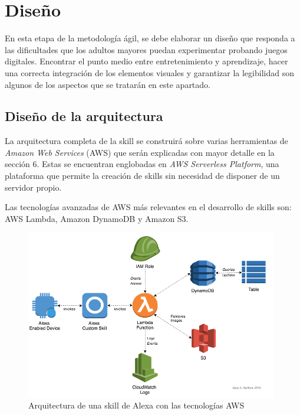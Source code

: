 \section{Diseño}

En esta etapa de la metodología ágil, se debe elaborar un diseño que responda a las dificultades que los adultos mayores puedan experimentar probando juegos digitales. Encontrar el punto medio entre entretenimiento y aprendizaje, hacer una correcta integración de los elementos visuales y garantizar la legibilidad son algunos de los aspectos que se tratarán en este apartado.

\subsection{Diseño de la arquitectura}

La arquitectura completa de la skill se construirá sobre varias herramientas de \textit{Amazon Web Services} (AWS) que serán explicadas con mayor detalle en la sección 6. Estas se encuentran englobadas en \textit{AWS Serverless Platform}, una plataforma que permite la creación de skills sin necesidad de disponer de un servidor propio. 

Las tecnologías avanzadas de AWS más relevantes en el desarrollo de skills son: AWS Lambda, Amazon DynamoDB y Amazon S3.

\begin{figure}[H]
	\centering
	\includegraphics[width=0.98\textwidth]{imgs/arquitectura-skill.png}
	\caption{Arquitectura de una skill de Alexa con las tecnologías AWS \parencite{arquitecturaSkill}}
	\label{fig:arquitectura-skill}
\end{figure}


